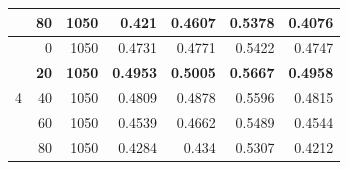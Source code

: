 \documentclass[a4paper]{llncs}
\begin{document}
\begin{table}[htbp!]
{\begin{tabular}{crrrrrr}
                   & 80          & 1050           & 0.421           & 0.4607          & 0.5378          & 0.4076          \\ \hline
\multirow{5}{*}{4} & 0           & 1050           & 0.4731          & 0.4771          & 0.5422          & 0.4747          \\
                   & \textbf{20} & \textbf{1050}  & \textbf{0.4953} & \textbf{0.5005} & \textbf{0.5667} & \textbf{0.4958} \\
                   & 40          & 1050           & 0.4809          & 0.4878          & 0.5596          & 0.4815          \\
                   & 60          & 1050           & 0.4539          & 0.4662          & 0.5489          & 0.4544          \\
                   & 80          & 1050           & 0.4284          & 0.434           & 0.5307          & 0.4212          \\ \hline
\end{tabular}%
}
\end{table}
\end{document}
